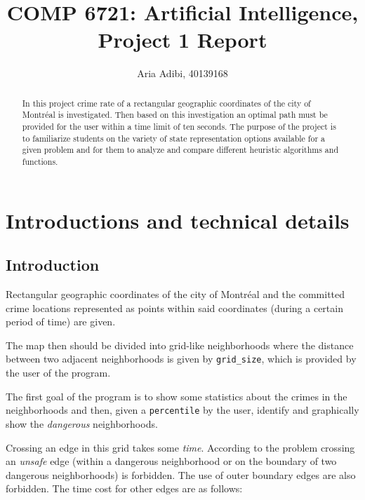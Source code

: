 \documentclass[11pt]{article}
\title{COMP 6721: Artificial Intelligence,\\Project 1 Report}
\author{ Aria Adibi, 40139168}
\date{}
\begin{document}
	\maketitle
	
	
	\begin{abstract}
			In this project crime rate of a rectangular geographic coordinates of the city of Montr\'eal is investigated. Then based on this investigation an optimal path must be provided for the 
			user within a time limit of ten seconds. The purpose of the project is to familiarize students on the variety of state representation options available for a given problem and
			for them to analyze and compare different heuristic algorithms and functions.
	\end{abstract}
	
	\pagebreak %
	
	\tableofcontents
	\listoftables
	
	\newpage
	
	\section{ Introductions and technical details }
		\subsection{ Introduction }
			Rectangular geographic coordinates of the city of Montr\'eal and the committed crime locations represented as points within said coordinates (during a certain period of time) are given. 
			
			The map then should be divided into grid-like neighborhoods where the distance between two adjacent neighborhoods is given by \texttt{grid\_size}, which is provided by
			the user of the program. 
			
			The first goal of the program is to show some statistics about the crimes in the neighborhoods and then, given a \texttt{percentile} by the user, identify and graphically show
			the \emph{dangerous} neighborhoods.
			
			Crossing an edge in this grid takes some \emph{time}. According to the problem crossing an \emph{unsafe} edge (within a dangerous neighborhood or on the boundary of two dangerous
			neighborhoods) is forbidden. The use of outer boundary edges are also forbidden. The time cost for other edges are as follows:
			
\end{document}
